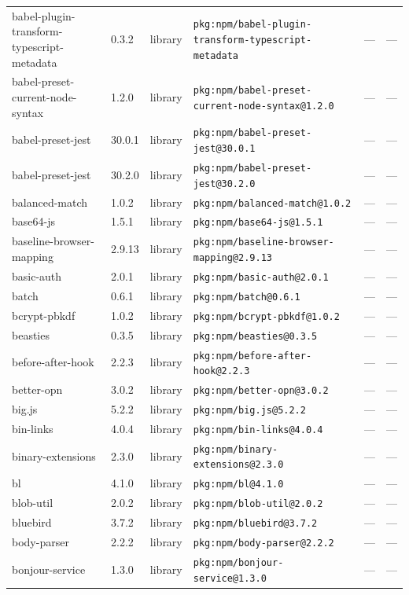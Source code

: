 \documentclass[11pt]{article}
\begin{document}
\begin{longtable}{|l|l|l|p{2.2cm}|l|p{4cm}|}
babel-plugin-transform-typescript-metadata & 0.3.2 & library & \texttt{pkg:npm/babel-plugin-transform-typescript-metadata} & — & — \\
babel-preset-current-node-syntax & 1.2.0 & library & \texttt{pkg:npm/babel-preset-current-node-syntax@1.2.0} & — & — \\
babel-preset-jest & 30.0.1 & library & \texttt{pkg:npm/babel-preset-jest@30.0.1} & — & — \\
babel-preset-jest & 30.2.0 & library & \texttt{pkg:npm/babel-preset-jest@30.2.0} & — & — \\
balanced-match & 1.0.2 & library & \texttt{pkg:npm/balanced-match@1.0.2} & — & — \\
base64-js & 1.5.1 & library & \texttt{pkg:npm/base64-js@1.5.1} & — & — \\
baseline-browser-mapping & 2.9.13 & library & \texttt{pkg:npm/baseline-browser-mapping@2.9.13} & — & — \\
basic-auth & 2.0.1 & library & \texttt{pkg:npm/basic-auth@2.0.1} & — & — \\
batch & 0.6.1 & library & \texttt{pkg:npm/batch@0.6.1} & — & — \\
bcrypt-pbkdf & 1.0.2 & library & \texttt{pkg:npm/bcrypt-pbkdf@1.0.2} & — & — \\
beasties & 0.3.5 & library & \texttt{pkg:npm/beasties@0.3.5} & — & — \\
before-after-hook & 2.2.3 & library & \texttt{pkg:npm/before-after-hook@2.2.3} & — & — \\
better-opn & 3.0.2 & library & \texttt{pkg:npm/better-opn@3.0.2} & — & — \\
big.js & 5.2.2 & library & \texttt{pkg:npm/big.js@5.2.2} & — & — \\
bin-links & 4.0.4 & library & \texttt{pkg:npm/bin-links@4.0.4} & — & — \\
binary-extensions & 2.3.0 & library & \texttt{pkg:npm/binary-extensions@2.3.0} & — & — \\
bl & 4.1.0 & library & \texttt{pkg:npm/bl@4.1.0} & — & — \\
blob-util & 2.0.2 & library & \texttt{pkg:npm/blob-util@2.0.2} & — & — \\
bluebird & 3.7.2 & library & \texttt{pkg:npm/bluebird@3.7.2} & — & — \\
body-parser & 2.2.2 & library & \texttt{pkg:npm/body-parser@2.2.2} & — & — \\
bonjour-service & 1.3.0 & library & \texttt{pkg:npm/bonjour-service@1.3.0} & — & — \\

\end{longtable}
\end{document}
